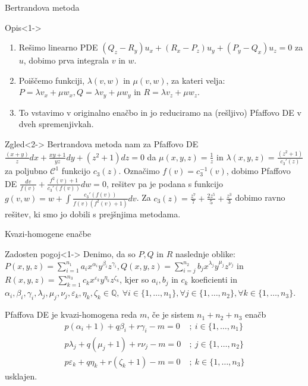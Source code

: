 \documentclass[t, 10pt]{beamer} %
\newcommand{\mth}[1]{\ensuremath{\mathbb{#1}}}
\newcommand{\Q}{\mth{Q}}
\newcommand{\fillblack}[1]{
	\begin{tikzpicture}[remember picture, overlay]
		\node [shift={(0 cm,0cm)}]  at (current page.south west)
		{%
			\begin{tikzpicture}[remember picture, overlay] at (current page.south west)
				\draw [fill=black] (0, 0) -- (0,#1 \paperheight) --
				(\paperwidth,#1 \paperheight) -- (\paperwidth,0) -- cycle ;
			\end{tikzpicture}
		};
		\draw (current page.north west) rectangle (current page.south east);
	\end{tikzpicture}
}
\begin{document}
		\begin{frame}{Bertrandova metoda}
			\begin{block}{Opis}<1->
				\begin{enumerate}
					\item Rešimo linearno PDE $(Q_z - R_y)u_x + (R_x - P_z)u_y + (P_y - Q_x)u_z = 0$ za $u$, dobimo prva integrala $v$ in $w$.
					\item Poiščemo funkciji, $\lambda(v, w)$ in $\mu(v, w)$, za kateri velja: 
						$P = \lambda v_x + \mu w_x, Q = \lambda v_y + \mu w_y$ in $R = \lambda v_z + \mu w_z$.
					\item To vstavimo v originalno enačbo in jo reduciramo na (rešljivo) Pfaffovo DE v dveh spremenjivkah.
				\end{enumerate}
			\end{block}
			\begin{block}{Zgled}<2->
				Bertrandova metoda nam za Pfaffovo DE $\frac{(x+y)}{z}dx + \frac{xy+1}{yz}dy + (z^2 + 1)dz = 0$ da $\mu(x, y, z) = \frac{1}{z}$ in $\lambda(x, y, z) = \frac{(z^2 +1)}{c_3'(z)}$ za poljubno $\mathcal{C}^1$ funkcijo $c_3(z)$. Označimo $f(v) = c_3^{-1}(v)$, dobimo Pfaffovo DE $\frac{dv}{f(v)} + \frac{f^2(v)+1}{c_3'(f(v))}dw = 0$, rešitev pa je podana s funkcijo $g(v, w) = w + \int \frac{c_3'(f(v))}{f(v)(f^2(v) + 1)}dv$. Za $c_3(z) = \frac{z^7}{7} + \frac{2z^5}{5} + \frac{z^3}{3}$ dobimo ravno rešitev, ki smo jo dobili s prejšnjima metodama.
			\end{block}
		\end{frame}
		
		\begin{frame}{Kvazi-homogene enačbe}
			\begin{block}{Zadosten pogoj}<1->
				Denimo, da so $P, Q$ in $R$ naslednje oblike: 
					$P(x, y, z) = \sum_{i = 1}^{n_1}a_ix^{\alpha_i}y^{\beta_i}z^{\gamma_i},
					Q(x, y, z) = \sum_{i = j}^{n_2}b_jx^{\lambda_j}y^{\mu_j}z^{\nu_j}$ in
					$R(x, y, z) = \sum_{k = 1}^{n_3}c_kx^{\varepsilon_k}y^{\eta_k}z^{\zeta_k}$, kjer so $a_i, b_j$ in $c_k$ koeficienti in $\alpha_i, \beta_i, \gamma_i, \lambda_j, \mu_j, \nu_j, \varepsilon_k, \eta_k, \zeta_k\in \Q,~ \forall i\in \{1,\ldots, n_1\}, \forall j\in \{1,\ldots, n_2\}, \forall k\in \{1,\ldots, n_3\}$.
				
				Pfaffova DE je kvazi-homogena reda $m$, če je sistem $n_1 + n_2 + n_3$ enačb \begin{align*}
					p(\alpha_i+1) + q\beta_i + r\gamma_i - m = 0~&;~ i\in \{1, \ldots, n_1\} \\
					p\lambda_j + q(\mu_j+1) + r\nu_j - m= 0~&;~ j\in \{1, \ldots, n_2\} \\
					p\varepsilon_k + q\eta_k + r(\zeta_k+1) - m=0~&;~ k\in \{1, \ldots, n_3\}
				\end{align*} usklajen.
			\end{block}
		\end{frame}
		
\end{document}

